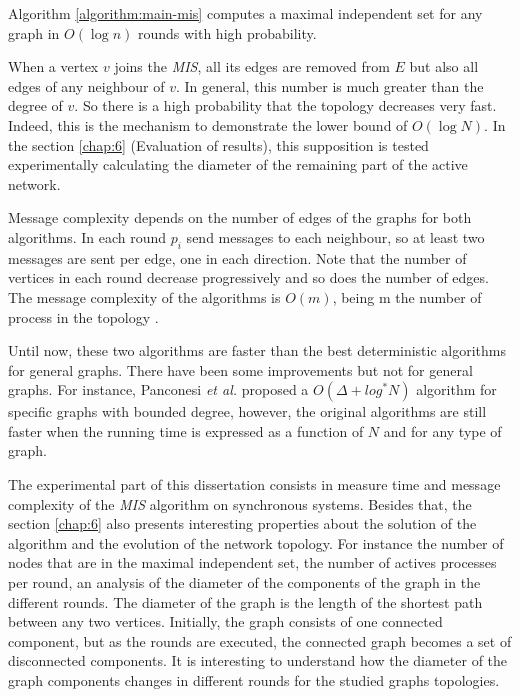 \begin{theorem}

Algorithm \ref{algorithm:main-mis} computes a maximal independent set for any graph in $O(\log n)$ rounds with high probability.

\end{theorem}

 When a vertex $v$ joins the \textit{MIS}, all its edges are removed from $E$ but also all edges of any neighbour of $v$. In general, this number is much greater than the degree of $v$. So there is a high probability that the topology decreases very fast. Indeed, this is the mechanism to demonstrate the lower bound of $O(\log N)$.  In the section \ref{chap:6} (Evaluation of results), this supposition is tested experimentally calculating the diameter of the remaining part of the active network. 
 
 
Message complexity depends on the number of edges of the graphs for both algorithms. In each round $p_i$ send messages to each neighbour, so at least two messages are sent per edge, one in each direction. Note that the number of vertices in each round decrease progressively and so does the number of edges. The message complexity of the algorithms is $O(m)$, being m the number of process in the topology \cite{luby1986simple}.


 Until now, these two algorithms are faster than the best deterministic algorithms for general graphs. There have been some improvements but not for general graphs. For instance, Panconesi \textit{et al.} \cite{panconesi1996complexity} proposed a $O(\Delta + log^* N)$ algorithm for specific graphs with bounded degree, however, the original algorithms are still faster when the running time is expressed as a function of $N$ and for any type of graph.
 

The experimental part of this dissertation consists in measure time and message complexity of the \textit{MIS} algorithm on synchronous systems. Besides that, the section \ref{chap:6} also presents interesting properties about the solution of the algorithm and the evolution of the network topology. For instance the number of nodes that are in the maximal independent set,  the number of actives processes per round, an analysis of the diameter of the components of the graph in the different rounds. The diameter of the graph is the length of the shortest path between any two vertices. Initially, the graph consists of one connected component, but as the rounds are executed, the connected graph becomes a set of disconnected components.  It is interesting to understand how the diameter of the graph components changes in different rounds for the studied graphs topologies.
 
 

